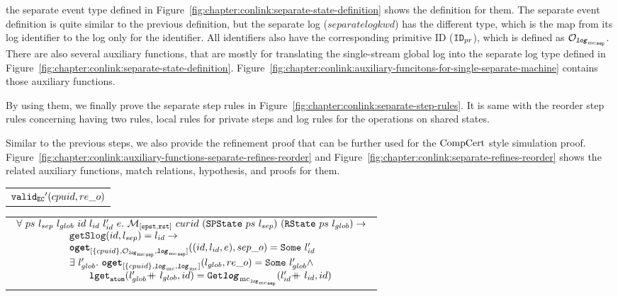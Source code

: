 the separate event type defined in Figure~\ref{fig:chapter:conlink:separate-state-definition}
shows the definition for them. The separate event definition is quite similar to the previous definition, 
but the separate log ($separatelogkwd$) has the different type,
 which is the map from its log identifier to the log only for the identifier. 
All identifiers also have the corresponding primitive ID (${{\mathrm{\texttt{ID}}}_{pr}}$), which is defined as ${\mathcal{O}_{{{{\mathrm{\texttt{\textbf{\textit{log}}}}}_{\mathrm{mc}}}_{{\mathrm{\texttt{sep}}}}}}}$.
There are also several auxiliary functions, 
that are mostly for translating the single-stream global log into the separate log type defined in Figure~\ref{fig:chapter:conlink:separate-state-definition}.
Figure~\ref{fig:chapter:conlink:auxiliary-funcitons-for-single-separate-machine} contains those auxiliary functions.

By using them, we finally prove the separate step rules in Figure~\ref{fig:chapter:conlink:separate-step-rules}. 
It is same with the reorder step rules concerning
having two rules, local rules for private steps and log rules for the operations on shared states. 

Similar to the previous steps, 
we also provide the refinement proof that can be further used for the $\mathrm{CompCert}$ style simulation proof. 
Figure~\ref{fig:chapter:conlink:auxiliary-functions-separate-refines-reorder} and 
Figure~\ref{fig:chapter:conlink:separate-refines-reorder} shows 
the related auxiliary functions, match relations, hypothesis, and proofs for them.

\begin{hypothesis}
\begin{tabular}{P{0.95\textwidth}}
${{{{\mathrm{\texttt{valid}}}_{{\mathrm{\texttt{EC}}}}}'}({cpuid}, {re\_o })}$
\end{tabular}
\end{hypothesis}

\begin{hypothesis}
\begin{tabular}{P{0.95\textwidth}}
$
\begin{array}{l}
\forall \ ps \ l_{sep} \ l_{glob} \ id  \ l_{id} \ l_{id}' \ e .\ \matchspstaterstate{curid}{(\spstate{ps}{l_{sep}})}{(\rstate{ps}{l_{glob}})} \rightarrow \\
\ \ \ \ \ \ \ \ \ \ \ \ \ \ \ \ \getseparatelog{id}{l_{sep}}{l_{id}} \rightarrow \\
\ \ \ \ \ \ \ \ \ \ \ \ \ \ \ \  \oget{\set{cpuid}}{\separateoraclelogtypekwd}{\separatelogtypekwd}{(id, l_{id}, e)}{sep\_o}{l_{id}'} \\
\ \ \ \ \ \ \ \ \ \ \ \ \ \ \ \   \exists \ l_{glob}' .\ \oget{\set{cpuid}}{\mclog}{\mclog}{l_{glob}}{re\_o}{l_{glob}'} \wedge \\
\ \ \ \ \ \ \ \ \ \ \ \ \ \ \ \  \ \ \ \ \ \ \loggetatom{\listapp{l_{glob}'}{l_{glob}}}{id}{\separatelogtwolognoeq{\listapp{l_{id}'}{l_{id}}}{id}} \\
\end{array}
$
\end{tabular}
\end{hypothesis}


